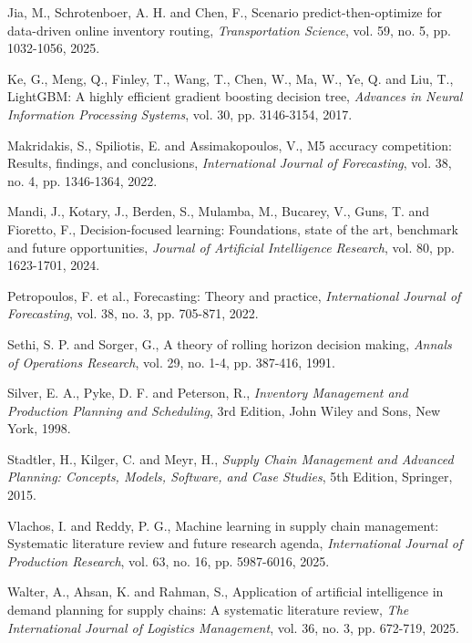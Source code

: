 \hangindent=0.25in Jia, M., Schrotenboer, A. H. and Chen, F., Scenario predict-then-optimize for data-driven online inventory routing, \textit{Transportation Science}, vol. 59, no. 5, pp. 1032-1056, 2025.

\hangindent=0.25in Ke, G., Meng, Q., Finley, T., Wang, T., Chen, W., Ma, W., Ye, Q. and Liu, T., LightGBM: A highly efficient gradient boosting decision tree, \textit{Advances in Neural Information Processing Systems}, vol. 30, pp. 3146-3154, 2017.

\hangindent=0.25in Makridakis, S., Spiliotis, E. and Assimakopoulos, V., M5 accuracy competition: Results, findings, and conclusions, \textit{International Journal of Forecasting}, vol. 38, no. 4, pp. 1346-1364, 2022.

\hangindent=0.25in Mandi, J., Kotary, J., Berden, S., Mulamba, M., Bucarey, V., Guns, T. and Fioretto, F., Decision-focused learning: Foundations, state of the art, benchmark and future opportunities, \textit{Journal of Artificial Intelligence Research}, vol. 80, pp. 1623-1701, 2024.

\hangindent=0.25in Petropoulos, F. et al., Forecasting: Theory and practice, \textit{International Journal of Forecasting}, vol. 38, no. 3, pp. 705-871, 2022.

\hangindent=0.25in Sethi, S. P. and Sorger, G., A theory of rolling horizon decision making, \textit{Annals of Operations Research}, vol. 29, no. 1-4, pp. 387-416, 1991.

\hangindent=0.25in Silver, E. A., Pyke, D. F. and Peterson, R., \textit{Inventory Management and Production Planning and Scheduling}, 3rd Edition, John Wiley and Sons, New York, 1998.

\hangindent=0.25in Stadtler, H., Kilger, C. and Meyr, H., \textit{Supply Chain Management and Advanced Planning: Concepts, Models, Software, and Case Studies}, 5th Edition, Springer, 2015.

\hangindent=0.25in Vlachos, I. and Reddy, P. G., Machine learning in supply chain management: Systematic literature review and future research agenda, \textit{International Journal of Production Research}, vol. 63, no. 16, pp. 5987-6016, 2025.

\hangindent=0.25in Walter, A., Ahsan, K. and Rahman, S., Application of artificial intelligence in demand planning for supply chains: A systematic literature review, \textit{The International Journal of Logistics Management}, vol. 36, no. 3, pp. 672-719, 2025.

\endgroup
